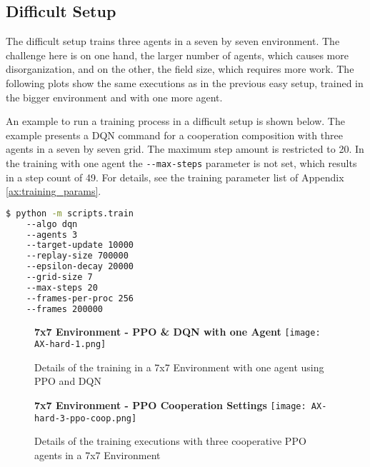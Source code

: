 \subsection{Difficult Setup}
The difficult setup trains three agents in a seven by seven environment. The challenge here is on one hand, the larger number of agents, which causes more disorganization, and on the other, the field size, which requires more work. The following plots show the same executions as in the previous easy setup, trained in the bigger environment and with one more agent.

An example to run a training process in a difficult setup is shown below. The example presents a DQN command for a cooperation composition with three agents in a seven by seven grid. The maximum step amount is restricted to 20. In the training with one agent the \verb|--max-steps| parameter is not set, which results in a step count of 49. For details, see the training parameter list of Appendix \ref{ax:training_params}.

\begin{lstlisting}[float=htp,caption=Exemplary command to execute training with three DQN agents in a difficult setup,label=lst:diff_command,language=bash ,xleftmargin=3ex,xrightmargin=1ex]
$ python -m scripts.train 
    --algo dqn 
    --agents 3
    --target-update 10000 
    --replay-size 700000 
    --epsilon-decay 20000
    --grid-size 7 
    --max-steps 20 
    --frames-per-proc 256
    --frames 200000
\end{lstlisting}

\newpage
\vfill
\begin{figure}
    \centering
    \textbf{7x7 Environment - PPO \& DQN with one Agent}
    \texttt{[image: AX-hard-1.png]}\\
    \caption[PPO and DQN Details of One Agent in a 7x7 Environment]{Details of the training in a 7x7 Environment with one agent using PPO and DQN}\label{fig:ax-hard-1}
\end{figure}
\vfill
\clearpage

\newpage
\vfill
\begin{figure}
    \centering
    \textbf{7x7 Environment - PPO Cooperation Settings}
    \texttt{[image: AX-hard-3-ppo-coop.png]}\\
    \caption[Details of PPO Cooperation Executions in a 7x7 Environment]{Details of the training executions with three cooperative PPO agents in a 7x7 Environment}\label{fig:ax-hard-2-ppo-coop}
\end{figure}
\vfill
\clearpage

